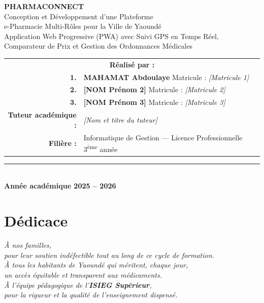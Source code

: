 \documentclass[12pt,a4paper,oneside]{report}
\newcommand{\isieg}{\textbf{ISIEG Supérieur}}
\begin{document}
\begin{titlepage}
\begin{center}
\vspace{0.6cm}
{\LARGE \textbf{PHARMACONNECT}}\\[6pt]
{\large Conception et Développement d'une Plateforme}\\[3pt]
{\large e-Pharmacie Multi-Rôles pour la Ville de Yaoundé}\\[4pt]
{\small Application Web Progressive (PWA) avec Suivi GPS en Temps Réel,}\\
{\small Comparateur de Prix et Gestion des Ordonnances Médicales}

\vspace{0.8cm}
\begin{tabular}{rl}
  \multicolumn{2}{c}{\textbf{Réalisé par :}} \\[4pt]
  \textbf{1.} & \textbf{MAHAMAT Abdoulaye} \quad Matricule : \textit{[Matricule 1]} \\[3pt]
  \textbf{2.} & \textbf{[NOM Prénom 2]} \quad Matricule : \textit{[Matricule 2]} \\[3pt]
  \textbf{3.} & \textbf{[NOM Prénom 3]} \quad Matricule : \textit{[Matricule 3]} \\[6pt]
  \textbf{Tuteur académique :} & \textit{[Nom et titre du tuteur]} \\[3pt]
  \textbf{Filière :} & Informatique de Gestion — Licence Professionnelle 3\textsuperscript{ème} année \\
\end{tabular}

\vspace{0.8cm}
\rule{0.6\linewidth}{0.4pt}\\[4pt]
{\large \textbf{Année académique 2025 -- 2026}}
\end{center}
\end{titlepage}

\setcounter{page}{1}

\chapter*{Dédicace}
\thispagestyle{plain}

\vspace*{3cm}
\begin{center}
  \textit{\Large À nos familles,}\\[0.5cm]
  \textit{pour leur soutien indéfectible tout au long de ce cycle de formation.}\\[1cm]
  \textit{À tous les habitants de Yaoundé qui méritent, chaque jour,}\\
  \textit{un accès équitable et transparent aux médicaments.}\\[1cm]
  \textit{À l'équipe pédagogique de l'\isieg{},}\\
  \textit{pour la rigueur et la qualité de l'enseignement dispensé.}
\end{center}
\clearpage
\end{document}
